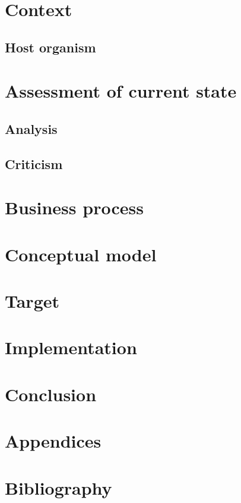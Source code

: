 \documentclass[11pt]{article}
\begin{document}
    \section{Context}\label{sec:context}

    \subsection{Host organism}\label{subsec:host-organization}
    

    \newpage

    \section{Assessment of current state}\label{sec:assessment-of-current-state}
    \subsection{Analysis}\label{subsec:analysis}
    

    \subsection{Criticism}\label{subsec:criticism}
    

    \newpage

    \section{Business process}\label{sec:business-process}
    

    \newpage

    \section{Conceptual model}\label{sec:conceptual-model}
    

    \section{Target}\label{sec:target-comp}
    

    \newpage

    \section{Implementation}\label{sec:implementation}
    

    \newpage

    \section{Conclusion}\label{sec:conclusion}

    \newpage

    \section{Appendices}\label{sec:appendices}

    \newpage

    \section{Bibliography}\label{sec:bibliography}

    
    
\end{document}
